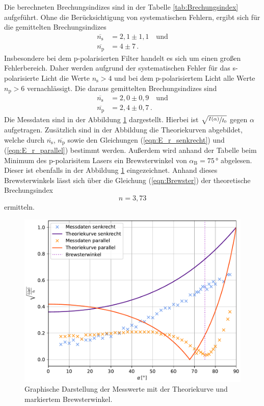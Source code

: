 Die berechneten Brechungsindizes sind in der Tabelle \ref{tab:Brechungsindex} aufgeführt. Ohne die Berücksichtigung von systematischen Fehlern, ergibt sich für die gemittelten Brechungsindizes
\begin{align*}
  \overline{n_{\text{s}}} &= 2,1\pm 1,1\quad \text{und}\\
  \overline{n_{\text{p}}} &= 4\pm 7\,.
\end{align*}
Insbesondere bei dem p-polarisierten Filter handelt es sich um einen großen Fehlerbereich. Daher werden aufgrund der systematischen Fehler für das s-polarisierte Licht die Werte $n_{\text{s}} > 4$ und bei dem p-polarisiertem 
Licht alle Werte $n_{\text{p}} > 6$ vernachlässigt. Die daraus gemittelten Brechungsindizes sind
\begin{align*}
  \overline{n_{\text{s}}} &= 2,0\pm 0,9\quad \text{und}\\
  \overline{n_{\text{p}}} &= 2,4\pm 0,7\,.
\end{align*}
Die Messdaten sind in der Abbildung \ref{fig:plot} dargestellt. Hierbei ist $\sqrt{\sfrac{I(\alpha)}{I_0}}$ gegen $\alpha$ aufgetragen. Zusätzlich sind in der Abbildung
die Theoriekurven abgebildet, welche durch $\overline{n_{\text{s}}}$, $\overline{n_{\text{p}}}$ sowie den Gleichungen (\ref{eqn:E_r_senkrecht}) und (\ref{eqn:E_r_parallel}) bestimmt werden.
Außerdem wird anhand der Tabelle beim Minimum des p-polarisitem Lasers ein Brewsterwinkel von $\alpha_{\text{B}} = 75\,°$ abgelesen. Dieser ist ebenfalls in der Abbildung \ref{fig:plot} eingezeichnet.
Anhand dieses Brewsterwinkels lässt sich über die Gleichung (\ref{eqn:Brewster}) der theoretische Brechungsindex $$n = 3,73$$ ermitteln.
\begin{figure}[H]
  \includegraphics[width=\textwidth]{plot.pdf}
  \caption{Graphische Darstellung der Messwerte mit der Theoriekurve und markiertem Brewsterwinkel.}
  \label{fig:plot}
\end{figure}                
